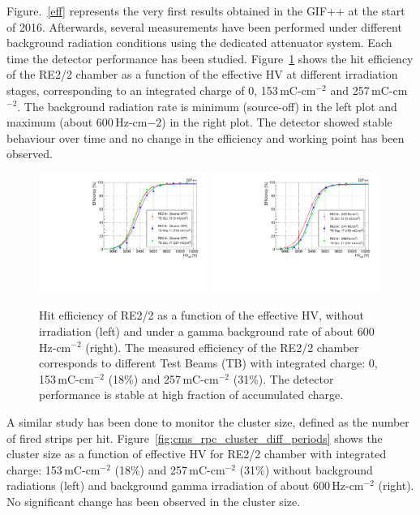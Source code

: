 Figure.~\ref{eff} represents the very first results obtained in the GIF++ at the start of 2016. Afterwards, several measurements have been performed under different background radiation conditions using the dedicated attenuator system. Each time the detector performance has been studied. Figure~\ref{fig:cms_rpc_eff_diff_periods} shows the hit efficiency of the RE2/2 chamber as a function of the effective HV at different irradiation stages, corresponding to an integrated charge of 0, 153\,mC-cm$^{-2}$ and 257\,mC-cm$^{-2}$. The background radiation rate is minimum (source-off) in the left plot and maximum (about 600\,Hz-cm${-2}$) in the right plot. The detector showed stable behaviour over time and no change in the efficiency and working point has been observed.    

\begin{figure}[h]
\centering
\includegraphics[width=0.49\textwidth,keepaspectratio=true]{fig/wincc/longevity/RE2-Efficiency.pdf}
\includegraphics[width=0.49\textwidth,keepaspectratio=true]{fig/wincc/longevity/RE2-Efficiency-600.pdf}
\caption{Hit efficiency of RE2/2 as a function of the effective HV, without irradiation (left) and under a gamma background rate of about 600\,Hz-cm$^{-2}$ (right). The measured efficiency of the RE2/2 chamber corresponds to different Test Beams (TB) with integrated charge: 0, 153\,mC-cm$^{-2}$ (18\%) and 257\,mC-cm$^{-2}$ (31\%). The detector performance is stable at high fraction of accumulated charge.}
\label{fig:cms_rpc_eff_diff_periods}
\end{figure}

A similar study has been done to monitor the cluster size, defined as the number of fired strips per hit. Figure~\ref{fig:cms_rpc_cluster_diff_periods} shows the cluster size as a function of effective HV for RE2/2 chamber with integrated charge: 153\,mC-cm$^{-2}$ (18\%) and 257\,mC-cm$^{-2}$ (31\%) without background radiations (left) and background gamma irradiation of about 600\,Hz-cm$^{-2}$ (right). No significant change has been observed in the cluster size.

